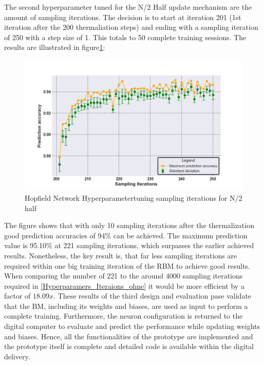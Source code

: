 The second hyperparameter tuned for the N/2 Half update mechanism are the amount of sampling iterations. 
The decision is to start at iteration 201 (1st iteration after the 200 thermaliation steps) and ending with a sampling iteration of 250 with a step size of 1.
This totals to 50 complete training sessions. The results are illustrated in figure\ref{Hyperparamers_Iteraions_mit}:
\begin{figure}[H]
    \centering
    \includegraphics[width=0.9\linewidth]{graphics/Iterations_MIT_N2_Half_Pred_Acc.png}
    \caption{Hopfield Network Hyperparametertuning sampling iterations for N/2 half}
    \label{Hyperparamers_Iteraions_mit}
\end{figure}
The figure shows that with only 10 sampling iterations after the thermalization good prediction accuracies of 94\% can be achieved. 
The maximum prediction value is 95.10\% at 221 sampling iterations, which surpasses the earlier achieved results.
Nonetheless, the key result is, that far less sampling iterations are required within one big training iteration of the \ac{RBM}
to achieve good results. 
When comparing the number of 221 to the around 4000 sampling iterations required in \ref{Hyperparamers_Iteraions_ohne} it would be more efficient by a factor of 
\(18.09x\).
These results of the third design and evaluation pase validate that the \ac{BM}, including its weights and biases, are used as 
input to perform a complete training. 
Furthermore, the neuron configuration is returned to the digital computer to evaluate and predict the performance while updating weights and biases. 
Hence, all the functionalities of the prototype are implemented and the prototype itself is complete and detailed code is available within the digital delivery. 

